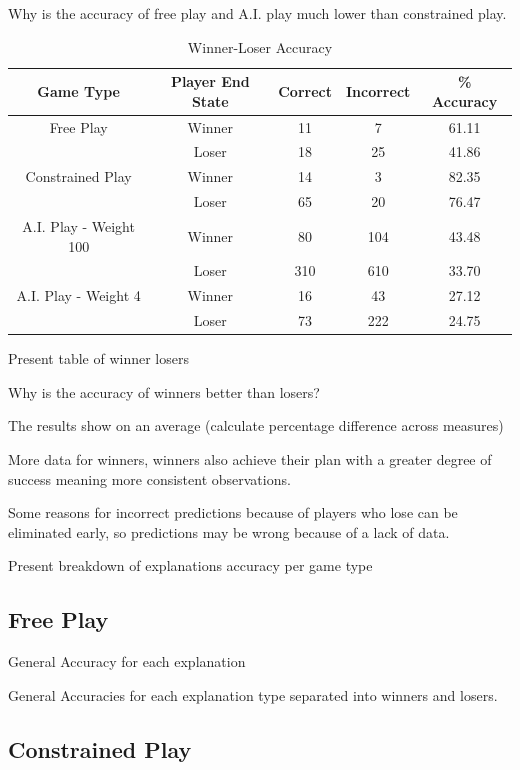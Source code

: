 \documentclass[parskip]{cs4rep}
\begin{document}
Why is the accuracy of free play and A.I. play much lower than constrained play.

\begin{table}[ht]
\centering
\begin{tabular}{|c|c|c|c|c|}
\hline 
\textbf{Game Type} & \textbf{Player End State} & \textbf{Correct} & \textbf{Incorrect} & \textbf{\% Accuracy} \\ 
\hline 
Free Play & Winner & 11 & 7 & 61.11 \\ 
& Loser & 18 & 25 & 41.86 \\ 
\hline 
Constrained Play & Winner & 14 & 3 & 82.35 \\ 
& Loser & 65 & 20 & 76.47 \\ 
\hline
A.I. Play - Weight 100 & Winner & 80 & 104 & 43.48 \\ 
& Loser & 310 & 610 & 33.70 \\  
\hline
A.I. Play - Weight 4 & Winner & 16 & 43 & 27.12 \\ 
& Loser & 73 & 222 & 24.75 \\ 
\hline
\end{tabular}
\caption{Winner-Loser Accuracy}
\label{table:winner-loser-accuracy}
\end{table}

Present table of winner losers

Why is the accuracy of winners better than losers?

The results show on an average (calculate percentage difference across measures)

More data for winners, winners also achieve their plan with a greater degree of success meaning more consistent observations.

Some reasons for incorrect predictions because of players who lose can be eliminated early, so predictions may be wrong because of a lack of data.

Present breakdown of explanations accuracy per game type

\subsection{Free Play}

General Accuracy for each explanation

General Accuracies for each explanation type separated into winners and losers.

\newpage

\subsection{Constrained Play}
\end{document}
